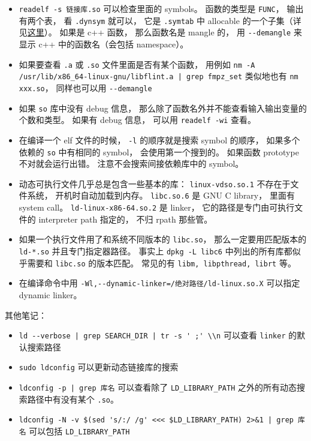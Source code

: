 \begin{itemize}
\item \verb`readelf -s 链接库.so` 可以检查里面的 symbols。 函数的类型是 \verb`FUNC`， 输出有两个表， 看 \verb`.dynsym` 就可以， 它是 \verb`.symtab` 中 allocable 的一个子集（详见\href{https://blogs.oracle.com/solaris/post/inside-elf-symbol-tables}{这里}）。 如果是 c++ 函数， 那么函数名是 mangle 的， 用 \verb`--demangle` 来显示 c++ 中的函数名（会包括 namespace）。
\item 如果要查看 \verb`.a` 或 \verb`.so` 文件里面是否有某个函数， 用例如 \verb`nm -A /usr/lib/x86_64-linux-gnu/libflint.a | grep fmpz_set` 类似地也有 \verb`nm xxx.so`， 同样也可以用 \verb`--demangle`
\item 如果 \verb`so` 库中没有 debug 信息， 那么除了函数名外并不能查看输入输出变量的个数和类型。 如果有 debug 信息， 可以用 \verb`readelf -wi` 查看。
\item 在编译一个 elf 文件的时候， \verb`-l` 的顺序就是搜索 symbol 的顺序， 如果多个依赖的 \verb`so` 中有相同的 symbol， 会使用第一个搜到的。 如果函数 prototype 不对就会运行出错。 注意不会搜索间接依赖库中的 symbol。
\item 动态可执行文件几乎总是包含一些基本的库： \verb`linux-vdso.so.1` 不存在于文件系统， 开机时自动加载到内存。 \verb`libc.so.6` 是 GNU C library， 里面有 system call。 \verb`ld-linux-x86-64.so.2` 是 linker， 它的路径是专门由可执行文件的 interpreter path 指定的， 不归 rpath 那些管。
\item 如果一个执行文件用了和系统不同版本的 \verb`libc.so`， 那么一定要用匹配版本的 \verb`ld-*.so` 并且专门指定器路径。 事实上 \verb`dpkg -L libc6` 中列出的所有库都似乎需要和 \verb`libc.so` 的版本匹配。 常见的有 \verb`libm, libpthread, librt` 等。
\item 在编译命令中用 \verb`-Wl,--dynamic-linker=/绝对路径/ld-linux.so.X` 可以指定 dynamic linker。
\end{itemize}

其他笔记：
\begin{itemize}
\item \verb`ld --verbose | grep SEARCH_DIR | tr -s ' ;' \\n` 可以查看 \verb`linker` 的默认搜索路径
\item \verb`sudo ldconfig` 可以更新动态链接库的搜索
\item \verb`ldconfig -p | grep 库名` 可以查看除了 \verb`LD_LIBRARY_PATH` 之外的所有动态搜索路径中有没有某个 \verb`.so`。
\item \verb`ldconfig -N -v $(sed 's/:/ /g' <<< $LD_LIBRARY_PATH) 2>&1 | grep 库名` 可以包括 \verb`LD_LIBRARY_PATH`
\end{itemize}

